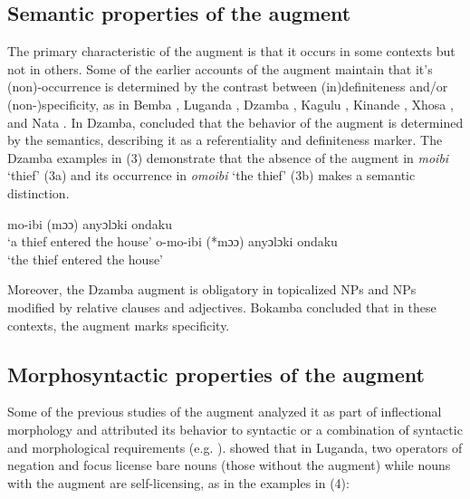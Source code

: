 \documentclass[output=paper]{langscibook}
\begin{document}
\subsection{Semantic properties of the augment} 
The primary characteristic of the augment is that it occurs in some contexts but not in others. Some of the earlier accounts of the augment maintain that it's (non)-occurrence is determined by the contrast between (in)definiteness and/or (non-)specificity, as in Bemba \citep{givon1972studies},  Luganda \citep{ashton1987luganda,ferrari2009,mould1974syntax}, Dzamba \citep{bokamba1971specificity},  Kagulu \citep{petzell2003function}, Kinande \citep{progovac1993non}, Xhosa \citep{visser2008definiteness},  and Nata \citep{gambarage2013pre,gambarage2019belief}. In Dzamba, \citet[220]{bokamba1971specificity} concluded that the behavior of the augment is determined by the semantics, describing it as a referentiality and definiteness marker. The Dzamba examples in (3) demonstrate that the absence of the augment in \textit{moibi} ‘thief’ (3a) and its occurrence in \textit{omoibi} ‘the thief’ (3b) makes a semantic distinction. 

\begin{exe}
\ex \label{hayagusii3}
\begin{xlist}
\ex mo-ibi (mɔɔ) anyɔlɔki  ondaku \\				
   ‘a thief entered the house’
 \ex    o-mo-ibi (*mɔɔ) anyɔlɔki    ondaku \\
    ‘the thief entered the house’ 
\end{xlist}
\end{exe}
Moreover, the Dzamba augment is obligatory in topicalized NPs and NPs modified by relative clauses and adjectives. Bokamba concluded that in these contexts, the augment marks specificity.

\subsection{Morphosyntactic properties of the augment}
Some of the previous studies of the augment analyzed it as part of inflectional morphology and attributed its behavior to syntactic or a combination of syntactic and morphological requirements  (e.g. \cite{dewees1971role,hyman1993augment,mould1974syntax}). \cite[224]{hyman1993augment} showed that in Luganda, two operators of negation and focus license bare nouns (those without the augment) while nouns with the augment are self-licensing, as in the examples in (4):
\end{document}
